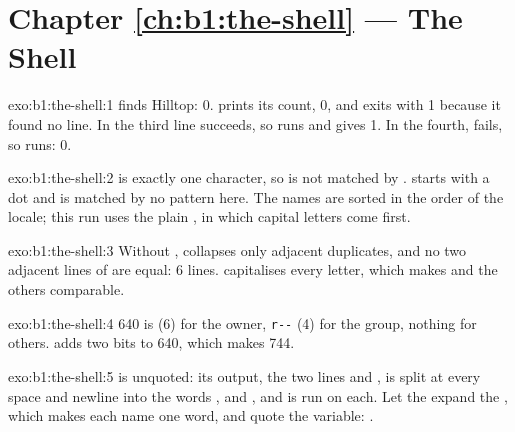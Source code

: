 \section*{Chapter \ref{ch:b1:the-shell} --- The Shell}

\begin{solution}{exo:b1:the-shell:1}
 finds Hilltop: 0.  prints its count, 0, and exits with 1 because it found no line. In the
third line  succeeds, so  runs and gives 1. In the fourth,  fails, so  runs: 0.
\end{solution}

\begin{solution}{exo:b1:the-shell:2}
 is exactly one character, so  is not matched by .  starts with a dot and
is matched by no pattern here. The names are sorted in the order of the locale; this run uses the plain , in
which capital letters come first.
\end{solution}

\begin{solution}{exo:b1:the-shell:3}
Without ,  collapses only adjacent duplicates, and no two adjacent lines of  are
equal: 6 lines.  capitalises every letter, which makes  and the others comparable.
\end{solution}

\begin{solution}{exo:b1:the-shell:4}
640 is  (6) for the owner, \texttt{r-{}-{}} (4) for the group, nothing for others.  adds two bits to
640, which makes 744.
\end{solution}

\begin{solution}{exo:b1:the-shell:5}
 is unquoted: its output, the two lines  and , is split at
every space and newline into the words ,  and , and  is run on
each. Let the  expand the , which makes each name one word, and quote the variable:
.
\end{solution}

